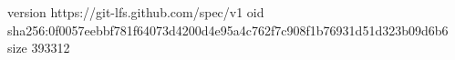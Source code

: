 version https://git-lfs.github.com/spec/v1
oid sha256:0f0057eebbf781f64073d4200d4e95a4c762f7c908f1b76931d51d323b09d6b6
size 393312
